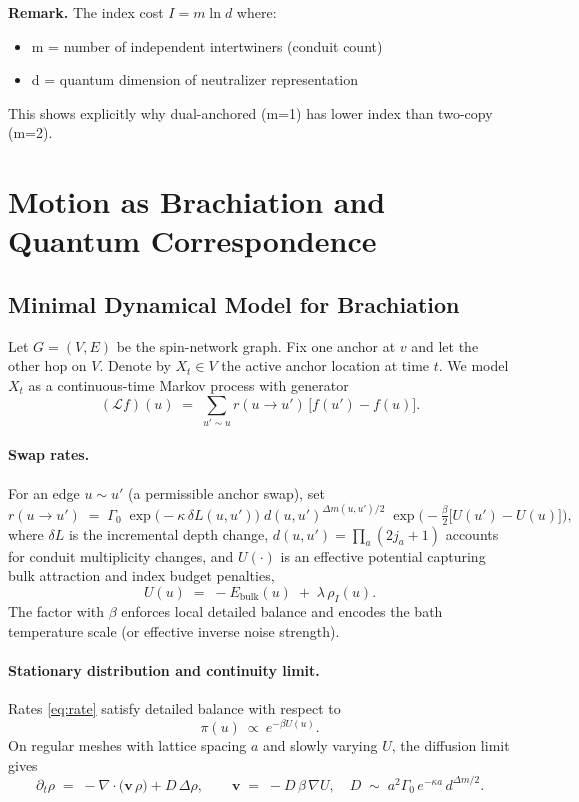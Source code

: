 \documentclass[11pt]{article}
\theoremstyle{plain}
\theoremstyle{definition}
\begin{document}
\textbf{Remark.}
The index cost $I = m \ln d$ where:
\begin{itemize}
  \item m = number of independent intertwiners (conduit count)
  \item d = quantum dimension of neutralizer representation
\end{itemize}
This shows explicitly why dual-anchored (m=1) has lower index than two-copy (m=2).

\section{Motion as Brachiation and Quantum Correspondence}
\label{sec:motion}
\subsection{Minimal Dynamical Model for Brachiation}
\label{subsec:brachiation-dynamics}

Let $G=(V,E)$ be the spin-network graph. Fix one anchor at $v$ and let the other hop on $V$. Denote by $X_t\in V$ the active anchor location at time $t$. We model $X_t$ as a continuous-time Markov process with generator
\[
  (\mathcal{L}f)(u)\;=\;\sum_{u'\sim u} r(u\!\to\!u')\,\big[f(u')-f(u)\big].
\]

\paragraph{Swap rates.}
For an edge $u\sim u'$ (a permissible anchor swap), set
\begin{equation}
  r(u\!\to\!u') \;=\; \Gamma_0\;
  \exp\!\Big(-\kappa\,\delta L(u,u')\Big)\;
  d(u,u')^{\Delta m(u,u')/2}\;
  \exp\!\Big(-\tfrac{\beta}{2}\big[U(u')-U(u)\big]\Big),
  \label{eq:rate}
\end{equation}
where $\delta L$ is the incremental depth change, $d(u,u')=\prod_a(2j_a+1)$ accounts for conduit multiplicity changes, and $U(\cdot)$ is an effective potential capturing bulk attraction and index budget penalties,
\[
  U(u)\;=\; -E_{\mathrm{bulk}}(u)\;+\;\lambda\,\rho_I(u).
\]
The factor with $\beta$ enforces local detailed balance and encodes the bath temperature scale (or effective inverse noise strength).

\paragraph{Stationary distribution and continuity limit.}
Rates \eqref{eq:rate} satisfy detailed balance with respect to
\[
  \pi(u)\ \propto\ e^{-\beta U(u)}.
\]
On regular meshes with lattice spacing $a$ and slowly varying $U$, the diffusion limit gives
\[
  \partial_t \rho \;=\; -\nabla\!\cdot\!\big(\mathbf{v}\,\rho\big) + D\,\Delta \rho,
  \qquad
  \mathbf{v}\;=\;-D\,\beta\,\nabla U,
  \quad
  D \;\sim\; a^2 \Gamma_0\,e^{-\kappa a}\, d^{\Delta m/2}.
\]
\end{document}
